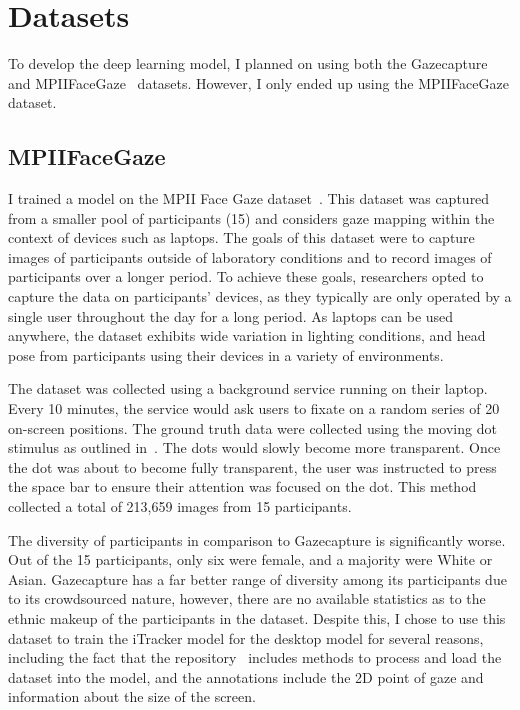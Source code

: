 \documentclass{report}
\begin{document}
\section{Datasets}

To develop the deep learning model, I planned on using both the Gazecapture~\cite{krafka2016eye} and MPIIFaceGaze~\cite{zhang2019mpii} datasets. However, I only ended up using the MPIIFaceGaze dataset.

\subsection{MPIIFaceGaze}\label{ssec:mpii-face-gaze}

I trained a model on the MPII Face Gaze dataset~\cite{zhang2019mpii}. This dataset was captured from a smaller pool of participants (15) and considers gaze mapping within the context of devices such as laptops. The goals of this dataset were to capture images of participants outside of laboratory conditions and to record images of participants over a longer period. To achieve these goals, researchers opted to capture the data on participants' devices, as they typically are only operated by a single user throughout the day for a long period. As laptops can be used anywhere, the dataset exhibits wide variation in lighting conditions, and head pose from participants using their devices in a variety of environments. 

The dataset was collected using a background service running on their laptop. Every 10 minutes, the service would ask users to fixate on a random series of 20 on-screen positions. The ground truth data were collected using the moving dot stimulus as outlined in~\cite{kassner2014pupil}. The dots would slowly become more transparent. Once the dot was about to become fully transparent, the user was instructed to press the space bar to ensure their attention was focused on the dot. This method collected a total of 213,659 images from 15 participants. 

The diversity of participants in comparison to Gazecapture is significantly worse. Out of the 15 participants, only six were female, and a majority were White or Asian. Gazecapture has a far better range of diversity among its participants due to its crowdsourced nature, however, there are no available statistics as to the ethnic makeup of the participants in the dataset. Despite this, I chose to use this dataset to train the iTracker model for the desktop model for several reasons, including the fact that the repository~\cite{krafka2016eye,cheng2021survey} includes methods to process and load the dataset into the model, and the annotations include the 2D point of gaze and information about the size of the screen. 
\end{document}
